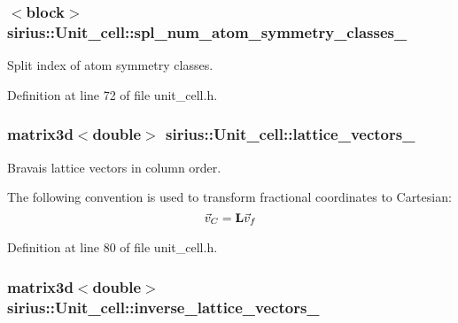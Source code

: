 \subsubsection[{spl\+\_\+num\+\_\+atom\+\_\+symmetry\+\_\+classes\+\_\+}]{$<$block$>$ sirius\+::\+Unit\+\_\+cell\+::spl\+\_\+num\+\_\+atom\+\_\+symmetry\+\_\+classes\+\_\+\hspace{0.3cm}{\ttfamily [private]}}\label{classsirius_1_1_unit__cell_a0f687f85fea7ba773bd6b219716da314}


Split index of atom symmetry classes. 



Definition at line 72 of file unit\+\_\+cell.\+h.

\hypertarget{classsirius_1_1_unit__cell_acb1fbcd9964cb8415d38c2e23c77c076}{}
\subsubsection[{lattice\+\_\+vectors\+\_\+}]{\setlength{\rightskip}{0pt plus 5cm}matrix3d$<$double$>$ sirius\+::\+Unit\+\_\+cell\+::lattice\+\_\+vectors\+\_\+\hspace{0.3cm}{\ttfamily [private]}}\label{classsirius_1_1_unit__cell_acb1fbcd9964cb8415d38c2e23c77c076}


Bravais lattice vectors in column order. 

The following convention is used to transform fractional coordinates to Cartesian\+: \[ \vec v_{C} = {\bf L} \vec v_{f} \] 

Definition at line 80 of file unit\+\_\+cell.\+h.

\hypertarget{classsirius_1_1_unit__cell_a1b06a6e1dabc61b9bb30fe6aa879e804}{}
\subsubsection[{inverse\+\_\+lattice\+\_\+vectors\+\_\+}]{\setlength{\rightskip}{0pt plus 5cm}matrix3d$<$double$>$ sirius\+::\+Unit\+\_\+cell\+::inverse\+\_\+lattice\+\_\+vectors\+\_\+\hspace{0.3cm}{\ttfamily [private]}}\label{classsirius_1_1_unit__cell_a1b06a6e1dabc61b9bb30fe6aa879e804}


